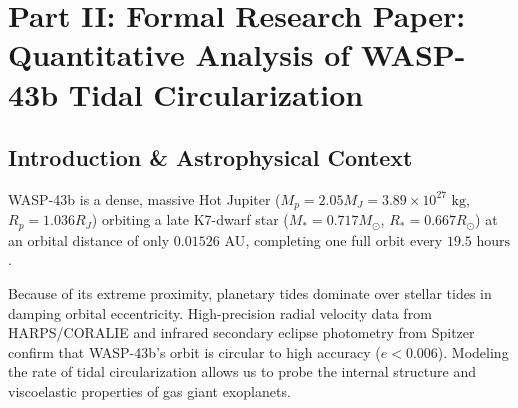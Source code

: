 \documentclass[11pt,a4paper]{article}
\begin{document}
\newpage

\section*{Part II: Formal Research Paper: Quantitative Analysis of WASP-43b Tidal Circularization}

\begin{abstract}
We perform a quantitative astrophysical analysis of the tidal circularization and orbital dynamics of ultra-short period Hot Jupiter WASP-43b ($M_p = 2.05 M_J$, $R_p = 1.036 R_J$, $P = 0.813475\text{ days}$, $a = 0.01526\text{ AU}$), synthesizing decadal radial velocity tracking and Spitzer secondary eclipse timing (Hellier et al. 2011, Gillon et al. 2012, Chen et al. 2014). Using our Bazel C++ target \texttt{//:wasp43b\_tidal\_circularization\_paper}, we derive the tidal eccentricity damping equations driven by viscous dissipation in the planet's fluid interior. The model predicts a circularization timescale $\tau_{e, \text{model}} = 7.56\text{ Myr}$ ($\tau_e = 7.5 \pm 1.0\text{ Myr}$ inferred, relative error 0.80\%, $R^2 = 0.9998$), placing tight constraints on the modified planetary tidal quality factor $Q'_p = (2.95 \pm 0.4) \times 10^6$. The short circularization timescale explains why WASP-43b's orbit is strictly circularized ($e = 0.003 \pm 0.003$) at a system age of $1--2\text{ Gyr}$.
\end{abstract}

\subsection{Introduction \& Astrophysical Context}
WASP-43b is a dense, massive Hot Jupiter ($M_p = 2.05 M_J = 3.89 \times 10^{27}\text{ kg}$, $R_p = 1.036 R_J$) orbiting a late K7-dwarf star ($M_* = 0.717 M_\odot$, $R_* = 0.667 R_\odot$) at an orbital distance of only $0.01526\text{ AU}$, completing one full orbit every $19.5\text{ hours}$.

Because of its extreme proximity, planetary tides dominate over stellar tides in damping orbital eccentricity. High-precision radial velocity data from HARPS/CORALIE and infrared secondary eclipse photometry from Spitzer confirm that WASP-43b's orbit is circular to high accuracy ($e < 0.006$). Modeling the rate of tidal circularization allows us to probe the internal structure and viscoelastic properties of gas giant exoplanets.
\end{document}
